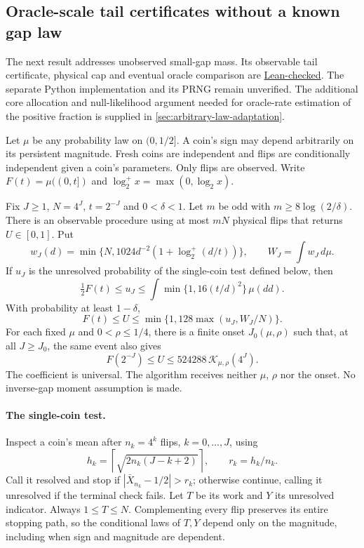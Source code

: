\subsection{Oracle-scale tail certificates without a known gap law}
\label{sec:arbitrary-law-tail}

The next result addresses unobserved small-gap mass. Its observable
tail certificate, physical cap and eventual oracle comparison are
\href{https://github.com/davidiach/adaptive-threshold-estimation/blob/39e3587b5a8f4d9466df7762f455ff587a40202e/lean/ThresholdHC/ArbitraryLawAdaptation/TailObservable.lean}{Lean-checked}.
The separate Python implementation and its PRNG remain unverified.
The additional core allocation and null-likelihood argument needed for
oracle-rate estimation of the positive fraction is supplied in
\cref{sec:arbitrary-law-adaptation}.

Let $\mu$ be any probability law on $(0,1/2]$. A coin's sign may depend
arbitrarily on its persistent magnitude. Fresh coins are independent and
flips are conditionally independent given a coin's parameters. Only flips
are observed. Write $F(t)=\mu((0,t])$ and $\log_2^+x=\max(0,\log_2x)$.

\begin{theorem}\label{thm:arbitrary-law-tail}
Fix $J\ge1$, $N=4^J$, $t=2^{-J}$ and $0<\delta<1$. Let $m$ be odd with
$m\ge8\log(2/\delta)$. There is an observable procedure using at most $mN$
physical flips that returns $U\in[0,1]$. Put
\[
 w_J(d)=\min\{N,1024d^{-2}(1+\log_2^+(d/t))\},\qquad
 W_J=\int w_J\,d\mu.
 \tag{AT1}
\]
If $u_J$ is the unresolved probability of the single-coin test defined below,
then
\[
 \tfrac12F(t)\le u_J\le\int\min\{1,16(t/d)^2\}\,\mu(dd).
 \tag{AT2}
\]
With probability at least $1-\delta$,
\[
 F(t)\le U\le\min\{1,128\max(u_J,W_J/N)\}.
 \tag{AT3}
\]
For each fixed $\mu$ and $0<\rho\le1/4$, there is a finite onset
$J_0(\mu,\rho)$ such that, at all $J\ge J_0$, the same event also gives
\[
 F(2^{-J})\le U\le524288\,\mathcal K_{\mu,\rho}(4^J).
 \tag{AT4}
\]
The coefficient is universal. The algorithm receives neither $\mu$, $\rho$
nor the onset. No inverse-gap moment assumption is made.
\end{theorem}

\paragraph{The single-coin test.}
Inspect a coin's mean after $n_k=4^k$ flips, $k=0,\ldots,J$, using
\[
 h_k=\left\lceil\sqrt{2n_k(J-k+2)}\right\rceil,
 \qquad r_k=h_k/n_k.
 \tag{AT5}
\]
Call it resolved and stop if $|\bar X_{n_k}-1/2|>r_k$; otherwise continue,
calling it unresolved if the terminal check fails. Let $T$ be its work and
$Y$ its unresolved indicator. Always $1\le T\le N$. Complementing every
flip preserves its entire stopping path, so the conditional laws of $T,Y$
depend only on the magnitude, including when sign and magnitude are dependent.

